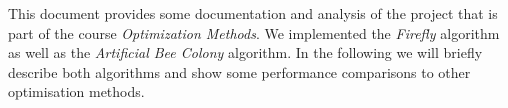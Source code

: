 This document provides some documentation and analysis of the project that is
part of the course \textit{Optimization Methods}. We
implemented the \textit{Firefly} algorithm \cite{firefly} as well as the
\textit{Artificial Bee Colony} \cite{beecolony} algorithm. In the following we
will briefly describe both algorithms and show some performance comparisons
to other optimisation methods.
